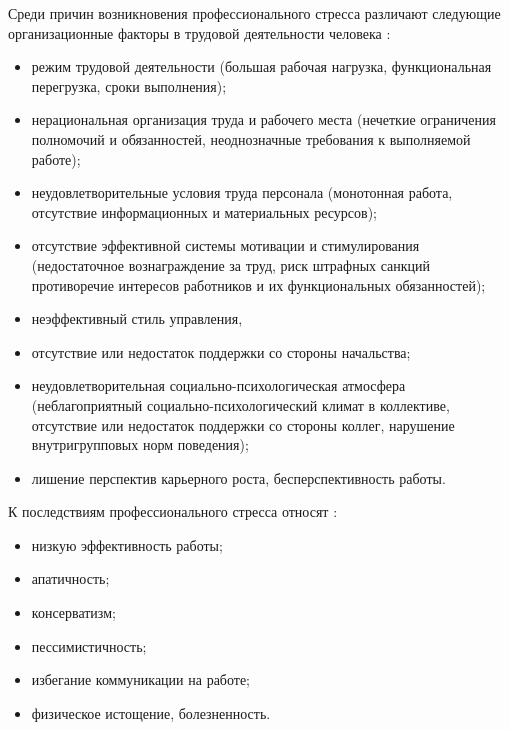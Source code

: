 Среди причин возникновения профессионального стресса различают следующие организационные факторы в трудовой деятельности человека \cite{professionalStress}:
\begin{itemize}[leftmargin=1.6\parindent]
\item режим трудовой деятельности (большая рабочая нагрузка, функциональная перегрузка, сроки выполнения);
\item нерациональная организация труда и рабочего места (нечеткие ограничения полномочий и обязанностей, неоднозначные требования к выполняемой работе);
\item неудовлетворительные условия труда персонала (монотонная работа, отсутствие информационных и материальных ресурсов);
\item отсутствие эффективной системы мотивации и стимулирования (недостаточное вознаграждение за труд, риск штрафных санкций противоречие интересов работников и их функциональных обязанностей);
\item неэффективный стиль управления, 
\item отсутствие или недостаток поддержки со стороны начальства;
\item неудовлетворительная социально-психологическая атмосфера (неблагоприятный социально-психологический климат в коллективе, отсутствие или недостаток поддержки со стороны коллег, нарушение внутригрупповых норм поведения);
\item лишение перспектив карьерного роста, бесперспективность работы.
\end{itemize}


К последствиям профессионального стресса относят \cite{professionalStress}:
\begin{itemize}[leftmargin=1.6\parindent]
\item низкую эффективность работы;
\item апатичность;
\item консерватизм;
\item пессимистичность;
\item избегание коммуникации на работе;
\item физическое истощение, болезненность.
\end{itemize}


